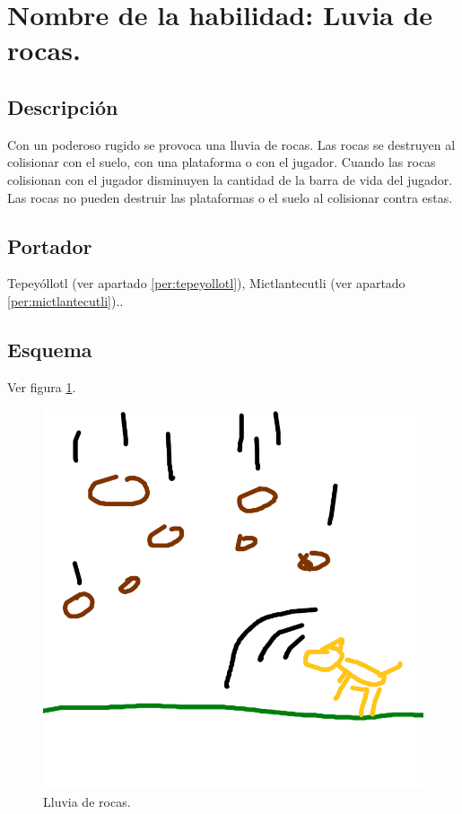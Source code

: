\section{Nombre de la habilidad: Luvia de rocas.} \label{hab.LLuviaRocas}
\subsection{Descripción}
Con un poderoso rugido se provoca una lluvia de rocas. Las rocas se destruyen al colisionar con el suelo, con una plataforma o con el jugador. Cuando las rocas colisionan con el jugador disminuyen la cantidad de la barra de vida del jugador. Las rocas no pueden destruir las plataformas o el suelo al colisionar contra estas.
\subsection{Portador}
Tepeyóllotl (ver apartado \ref{per:tepeyollotl}), Mictlantecutli (ver apartado \ref{per:mictlantecutli})..
\subsection{Esquema}
			Ver figura \ref{fig:lluviaR}.
			\begin{figure}
				\centering
				\includegraphics[height=0.2 \textheight]{Imagenes/lluviaR}
				\caption{Lluvia de rocas.}
				\label{fig:lluviaR}
			\end{figure}
